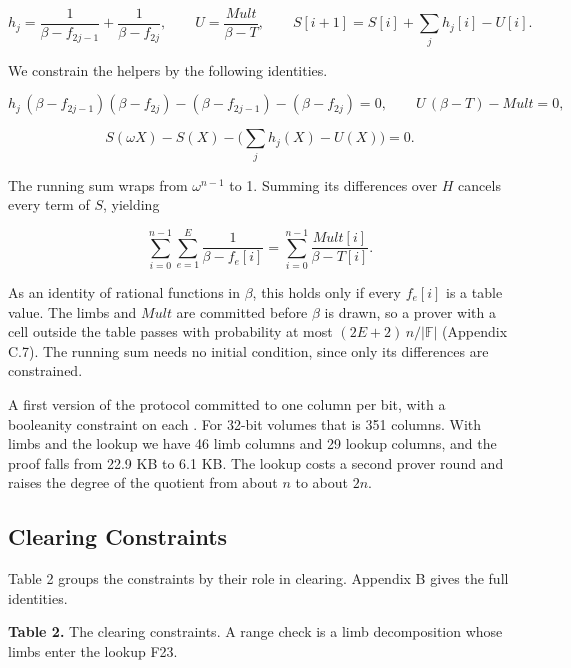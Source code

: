 \[h_j = \frac{1}{\beta - f_{2j-1}} + \frac{1}{\beta - f_{2j}}, \qquad U = \frac{Mult}{\beta - T}, \qquad S[i+1] = S[i] + \sum_j h_j[i] - U[i].\]

We constrain the helpers by the following identities.

\[h_j \,(\beta - f_{2j-1})(\beta - f_{2j}) - (\beta - f_{2j-1}) - (\beta - f_{2j}) = 0, \qquad U\,(\beta - T) - Mult = 0,\]

\[S(\omega X) - S(X) - \Big(\sum_j h_j(X) - U(X)\Big) = 0. \tag{F23}\]

The running sum wraps from \(\omega^{n-1}\) to 1. Summing its differences over \(H\) cancels every term of \(S\), yielding

\[\sum_{i=0}^{n-1} \sum_{e=1}^{E} \frac{1}{\beta - f_e[i]} = \sum_{i=0}^{n-1} \frac{Mult[i]}{\beta - T[i]}.\]

As an identity of rational functions in \(\beta\), this holds only if every \(f_e[i]\) is a table value. The limbs and \(Mult\) are committed before \(\beta\) is drawn, so a prover with a cell outside the table passes with probability at most \((2E+2)\,n/|\mathbb{F}|\) (Appendix C.7). The running sum needs no initial condition, since only its differences are constrained.

A first version of the protocol committed to one column per bit, with a booleanity constraint on each \cite{plonkbook}. For 32-bit volumes that is 351 columns. With limbs and the lookup we have 46 limb columns and 29 lookup columns, and the proof falls from 22.9 KB to 6.1 KB. The lookup costs a second prover round and raises the degree of the quotient from about \(n\) to about \(2n\).

\subsection{Clearing Constraints}

Table 2 groups the constraints by their role in clearing. Appendix B gives the full identities.

\textbf{Table 2.} The clearing constraints. A range check is a limb decomposition whose limbs enter the lookup F23.

